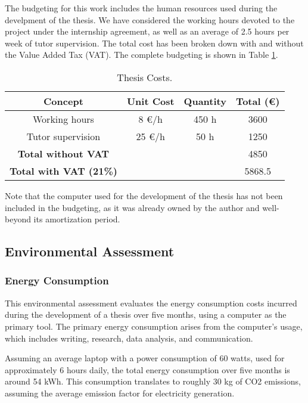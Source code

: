 \documentclass[a4paper,11pt, titlepage, twoside]{article}
\begin{document}
The budgeting for this work includes the human resources used during the develpment of the thesis. We have considered the working hours devoted to the project under the internship agreement, as well as an average of 2.5 hours per week of tutor supervision.
The total cost has been broken down with and without the Value Added Tax (VAT). The complete budgeting is shown in Table \ref{tab:costs}.
\begin{table}[h]
\centering
\begin{tabular}{c c c c}
\hline
\textbf{Concept} & \textbf{ Unit Cost} & \textbf{Quantity} & \textbf{ Total (\euro)} \\
\hline
Working hours & 8 \euro/h  & 450 h & 3600 \\
Tutor supervision & 25 \euro/h   &  50 h & 1250 \\
\hline
\textbf{Total without VAT} & & & 4850 \\
\hline
\textbf{Total with VAT (21\%)} & & &  5868.5 \\
\hline
\end{tabular}
\caption{Thesis Costs.}
\label{tab:costs}
\end{table}

Note that the computer used for the development of the thesis has not been included in the budgeting, as it was already owned by the author and well-beyond its amortization period.

\subsection{Environmental Assessment}

\subsubsection{Energy Consumption}

This environmental assessment evaluates the energy consumption costs incurred during
the development of a thesis over five months, using a computer as the primary tool. The primary energy consumption arises
from the computer's usage, which includes writing, research, data analysis, and communication.\par

Assuming an average laptop with a power consumption of 60 watts, used for approximately 6 hours daily, the total energy consumption
over five months is around 54 kWh. This consumption translates to roughly 30 kg of CO2 emissions, assuming the average emission
factor for electricity generation.\par
\end{document}

